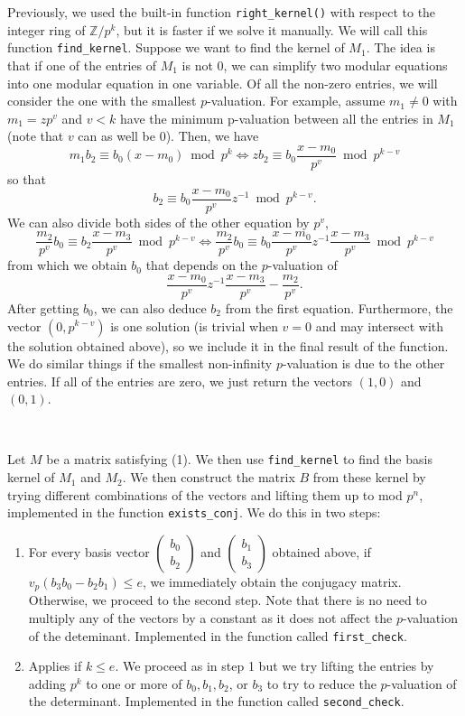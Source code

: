 \documentclass[letterpaper,12pt]{article}
\newcommand{\Z}{\mathbb{Z}}
\begin{document}
Previously, we used the built-in function \texttt{right\_kernel()} with respect to
the integer ring of $\Z/p^k$, but it is faster if we solve it manually. 
We will call this function \texttt{find\_kernel}. 
Suppose we want to find the kernel of $M_1$.
The idea is that if one of the entries of $M_1$ is not 0, 
we can simplify two modular equations into one modular equation in one variable.
Of all the non-zero entries, we will consider the one with the smallest $p$-valuation.
For example, assume $m_1 \neq 0$ with $m_1 = zp^v$ and $v < k$
have the minimum p-valuation between all the entries in $M_1$
(note that $v$ can as well be 0). 
Then, we have  
\[
m_1b_2 \equiv b_0(x-m_0) \bmod p^k
\iff zb_2 \equiv b_0 \frac{x-m_0}{p^v} \bmod p^{k-v}
\]
so that 
\[
b_2 \equiv b_0 \frac{x-m_0}{p^v} z^{-1} \bmod p^{k-v}.
\]
We can also divide both sides of the other equation by $p^v$,
\[
\frac{m_2}{p^v} b_0 \equiv b_2\frac{x-m_3}{p^v} \bmod p^{k-v}
\iff \frac{m_2}{p^v} b_0 \equiv b_0 \frac{x-m_0}{p^v} z^{-1} \frac{x-m_3}{p^v} \bmod p^{k-v}
\]
from which we obtain $b_0$ that depends on the $p$-valuation of 
\[
\frac{x-m_0}{p^v} z^{-1} \frac{x-m_3}{p^v} - \frac{m_2}{p^v}.
\]
After getting $b_0$, we can also deduce $b_2$ from the first equation.
Furthermore, the vector $(0, p^{k-v})$ is one 
solution (is trivial when $v = 0$ and may intersect with the solution obtained above), 
so we include it in the final result of the function.
We do similar things if the smallest non-infinity $p$-valuation 
is due to the other entries.
If all of the entries are zero, we just return 
the vectors $(1,0)$ and $(0,1)$.

\

Let $M$ be a matrix satisfying (1).
We then use \texttt{find\_kernel} 
to find the basis kernel of $M_1$ and $M_2$.
We then construct the matrix $B$ from these kernel by trying different combinations 
of the vectors and lifting them up to mod $p^n$,
implemented in the function \texttt{exists\_conj}.
We do this in two steps:
\begin{enumerate}
\item For every basis vector $\begin{pmatrix} b_0 \\ b_2 \end{pmatrix}$ and 
$\begin{pmatrix} b_1 \\ b_3 \end{pmatrix}$ obtained above, 
if $v_p(b_3b_0-b_2b_1) \leq e$, we immediately obtain the conjugacy matrix.
Otherwise, we proceed to the second step.
Note that there is no need to multiply any of the vectors by a 
constant as it does not affect the $p$-valuation of the deteminant. 
Implemented in the function called \texttt{first\_check}.

\item Applies if $k \leq e$. We proceed as in step 1 but we try lifting the entries 
by adding $p^k$ to one or more of $b_0, b_1, b_2$, or $b_3$ to try to 
reduce the $p$-valuation of the determinant.
Implemented in the function called \texttt{second\_check}.
\end{enumerate}
\end{document}
